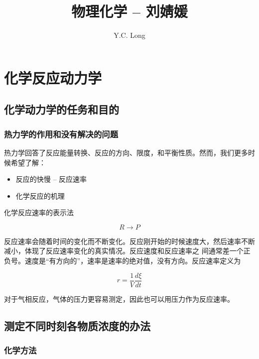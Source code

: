 \documentclass[a4paper]{ctexrep}
\author{Y.C. Long}
\title{物理化学 -- 刘婧媛}
\begin{document}
    \maketitle
    \tableofcontents

    
    
    
    \chapter{化学反应动力学}
    
    \section{化学动力学的任务和目的}

    \subsection{热力学的作用和没有解决的问题}

    热力学回答了反应能量转换、反应的方向、限度，和平衡性质。然而，我们更多时候希望了解：

    \begin{itemize}
      \item 反应的快慢 -- 反应速率
      \item 化学反应的机理
    \end{itemize}

    化学反应速率的表示法

    \[
       R \rightarrow P
    \]

    反应速率会随着时间的变化而不断变化。反应刚开始的时候速度大，然后速率不断减小，体现了反应速率变化的真实情况。反应速度和反应速率之 间通常差一个正负号。速度是``有方向的''，速率是速率的绝对值，没有方向。反应速率定义为

    \[
      r = \frac{1}{V} \frac{d \xi}{dt}
    \]

    对于气相反应，气体的压力更容易测定，因此也可以用压力作为反应速率。

    \section{测定不同时刻各物质浓度的办法}

    \subsection{化学方法}
\end{document}
